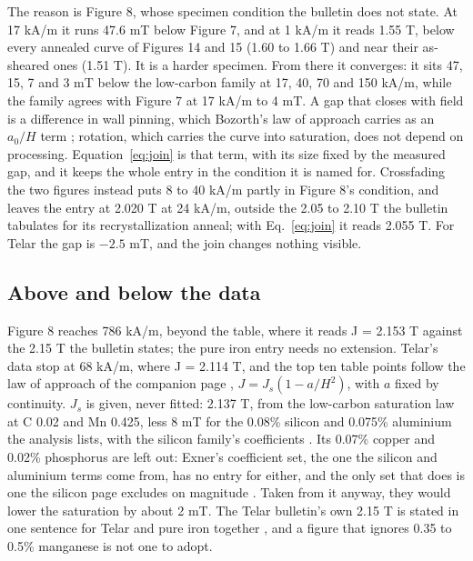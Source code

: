 \documentclass[
  11pt,
]{article}
\begin{document}
The reason is Figure 8, whose specimen condition the bulletin does not state. At 17 kA/m it runs 47.6 mT below Figure 7, and at 1 kA/m it reads 1.55 T, below every annealed curve of Figures 14 and 15 (1.60 to 1.66 T) and near their as-sheared ones (1.51 T). It is a harder specimen. From there it converges: it sits 47, 15, 7 and 3 mT below the low-carbon family at 17, 40, 70 and 150 kA/m, while the family agrees with Figure 7 at 17 kA/m to 4 mT. A gap that closes with field is a difference in wall pinning, which Bozorth's law of approach carries as an \(a_0/H\) term \cite{bozorth1951}; rotation, which carries the curve into saturation, does not depend on processing. Equation~\eqref{eq:join} is that term, with its size fixed by the measured gap, and it keeps the whole entry in the condition it is named for. Crossfading the two figures instead puts 8 to 40 kA/m partly in Figure 8's condition, and leaves the entry at 2.020 T at 24 kA/m, outside the 2.05 to 2.10 T the bulletin tabulates for its recrystallization anneal; with Eq.~\eqref{eq:join} it reads 2.055 T. For Telar the gap is \(-2.5\) mT, and the join changes nothing visible.

\subsection{Above and below the data}\label{above-and-below-the-data}

Figure 8 reaches 786 kA/m, beyond the table, where it reads J = 2.153 T against the 2.15 T the bulletin states; the pure iron entry needs no extension. Telar's data stop at 68 kA/m, where J = 2.114 T, and the top ten table points follow the law of approach of the companion page \cite{meeker-lowcarbon}, \(J = J_s(1 - a/H^{2})\), with \(a\) fixed by continuity. \(J_s\) is given, never fitted: 2.137 T, from the low-carbon saturation law at C 0.02 and Mn 0.425, less 8 mT for the 0.08\% silicon and 0.075\% aluminium the analysis lists, with the silicon family's coefficients \cite{meeker-silicon}. Its 0.07\% copper and 0.02\% phosphorus are left out: Exner's coefficient set, the one the silicon and aluminium terms come from, has no entry for either, and the only set that does is one the silicon page excludes on magnitude \cite{meeker-silicon}. Taken from it anyway, they would lower the saturation by about 2 mT. The Telar bulletin's own 2.15 T is stated in one sentence for Telar and pure iron together \cite{armco-telar}, and a figure that ignores 0.35 to 0.5\% manganese is not one to adopt.
\end{document}
